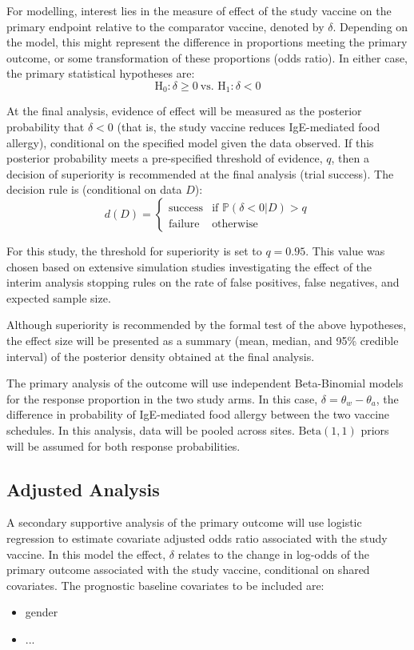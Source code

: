 \documentclass{bmcart}
\begin{document}
For modelling, interest lies in the measure of effect of the study vaccine on the primary endpoint relative to the comparator vaccine, denoted by \(\delta\).
Depending on the model, this might represent the difference in proportions meeting the primary outcome, or some transformation of these proportions (odds ratio).
In either case, the primary statistical hypotheses are:
$$
\textrm{H}_0:\delta\geq 0\ \text{vs. } \mathrm{H}_1:\delta <0
$$

At the final analysis, evidence of effect will be measured as the posterior probability that $\delta < 0$ (that is, the study vaccine reduces IgE-mediated food allergy), conditional on the specified model given the data observed.
If this posterior probability meets a pre-specified threshold of evidence, \(q\), then a decision of superiority is recommended at the final analysis (trial success).
The decision rule is (conditional on data $D$):
$$
d(D) = \begin{cases}
\text{success} & \text{if } \mathbb{P}(\delta<0|D)>q \\
\text{failure}\ & \text{otherwise}
\end{cases}
$$

For this study, the threshold for superiority is set to $q=0.95$.
This value was chosen based on extensive simulation studies investigating the effect of the interim analysis stopping rules on the rate of false positives, false negatives, and expected sample size.

Although superiority is recommended by the formal test of the above hypotheses, the effect size will be presented as a summary (mean, median, and 95\% credible interval) of the posterior density obtained at the final analysis.

The primary analysis of the outcome will use independent Beta-Binomial models for the response proportion in the two study arms.
In this case, $\delta=\theta_w-\theta_a$, the difference in probability of IgE-mediated food allergy between the two vaccine schedules.
In this analysis, data will be pooled across sites.
$\text{Beta}(1,1)$ priors will be assumed for both response probabilities.

\subsection*{Adjusted Analysis}

A secondary supportive analysis of the primary outcome will use logistic regression to estimate covariate adjusted odds ratio associated with the study vaccine.
In this model the effect, $\delta$ relates to the change in log-odds of the primary outcome associated with the study vaccine, conditional on shared covariates.
The prognostic baseline covariates to be included are:
\begin{itemize}
	\item gender
	\item ...
\end{itemize}
\end{document}
